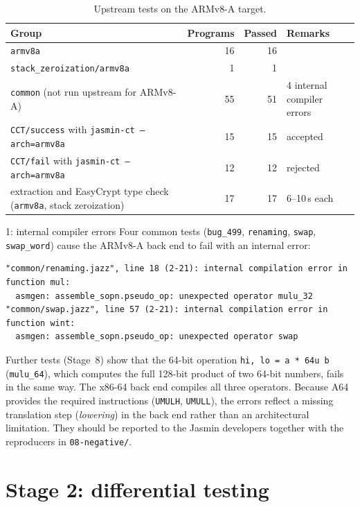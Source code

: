 \documentclass[11pt,a4paper]{article}
\newcommand{\file}[1]{\texttt{#1}}
\begin{document}
\begin{table}[h]
\centering\small
\begin{tabularx}{\textwidth}{@{}Xrrl@{}}
\toprule
\textbf{Group} & \textbf{Programs} & \textbf{Passed} & \textbf{Remarks} \\
\midrule
\file{armv8a} & 16 & 16 & \\
\file{stack\_zeroization/armv8a} & 1 & 1 & \\
\file{common} (not run upstream for ARMv8-A) & 55 & 51 & 4 internal compiler errors \\
\file{CCT/success} with \texttt{jasmin-ct --arch=armv8a} & 15 & 15 & accepted \\
\file{CCT/fail} with \texttt{jasmin-ct --arch=armv8a} & 12 & 12 & rejected \\
extraction and EasyCrypt type check (\file{armv8a}, stack zeroization) & 17 & 17 & 6--10\,s each \\
\bottomrule
\end{tabularx}
\caption{Upstream tests on the ARMv8-A target.}
\label{tab:upstream}
\end{table}

\begin{finding}{1: internal compiler errors}
Four common tests (\file{bug\_499}, \file{renaming}, \file{swap},
\file{swap\_word}) cause the ARMv8-A back end to fail with an internal error:
\begin{lstlisting}[style=output]
"common/renaming.jazz", line 18 (2-21): internal compilation error in function mul:
  asmgen: assemble_sopn.pseudo_op: unexpected operator mulu_32
"common/swap.jazz", line 57 (2-21): internal compilation error in function wint:
  asmgen: assemble_sopn.pseudo_op: unexpected operator swap
\end{lstlisting}
Further tests (Stage~8) show that the 64-bit operation
\texttt{hi, lo = a * 64u b} (\texttt{mulu\_64}), which computes the full
128-bit product of two 64-bit numbers, fails in the same way. The x86-64
back end compiles all three operators. Because A64 provides the required
instructions (\texttt{UMULH}, \texttt{UMULL}), the errors reflect a missing
translation step (\emph{lowering}) in the back end rather than an
architectural limitation. They should be reported to the Jasmin developers
together with the reproducers in \file{08-negative/}.
\end{finding}

\section{Stage 2: differential testing}
\end{document}
